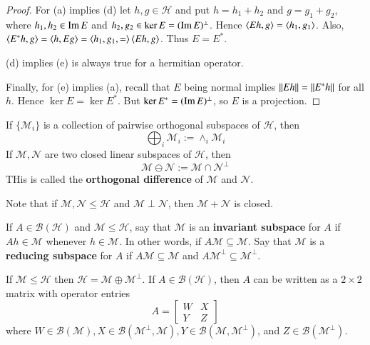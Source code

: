 \begin{proof}
    For (a) implies (d) let $h,g \in \mathscr{H}$ and put $h = h_1+h_2$ and $g = g_1+g_2$, where $h_1,h_2 \in \operatorname{Im} E$ and $h_2,g_2 \in \ker E = (\operatorname{Im} E)^{\perp}$. Hence $\left\langle Eh, g\right\rangle = \left\langle h_1, g_1\right\rangle$. Also, $\left\langle E^*h, g\right\rangle = \left\langle h, Eg\right\rangle = \left\langle h_1,g_1, =\right\rangle \left\langle Eh, g\right\rangle$. Thus $E = E^*$.

    (d) implies (e) is always true for a hermitian operator.

    Finally, for (e) implies (a), recall that $E$ being normal implies $\left|\left| Eh\right|\right| = \left|\left| E^*h\right|\right|$ for all $h$. Hence $\ker E = \ker E^*$. But $\ker E^* = (\operatorname{Im} E)^{\perp}$, so $E$ is a projection.
\end{proof}

\begin{defn}
    If $\{\mathscr{M}_i\}$ is a collection of pairwise orthogonal subspaces of $\mathscr{H}$, then $$\bigoplus_i\mathscr{M}_i := \land_i\mathscr{M}_i$$
    If $\mathscr{M},\mathscr{N}$ are two closed linear subspaces of $\mathscr{H}$, then $$\mathscr{M}\ominus\mathscr{N} := \mathscr{M}\cap \mathscr{N}^{\perp}$$
    THis is called the \textbf{orthogonal difference} of $\mathscr{M}$ and $\mathscr{N}$.
\end{defn}

Note that if $\mathscr{M},\mathscr{N}\leq \mathscr{H}$ and $\mathscr{M}\perp\mathscr{N}$, then $\mathscr{M}+\mathscr{N}$ is closed.

\begin{defn}
    If $A \in \mathscr{B}(\mathscr{H})$ and $\mathscr{M} \leq \mathscr{H}$, say that $\mathscr{M}$ is an \textbf{invariant subspace} for $A$ if $Ah \in \mathscr{M}$ whenever $h \in \mathscr{M}$. In other words, if $A\mathscr{M} \subseteq \mathscr{M}$. Say that $\mathscr{M}$ is a \textbf{reducing subspace} for $A$ if $A\mathscr{M}\subseteq \mathscr{M}$ and $A\mathscr{M}^{\perp} \subseteq \mathscr{M}^{\perp}$.
\end{defn}

If $\mathscr{M} \leq \mathscr{H}$ then $\mathscr{H} = \mathscr{M} \oplus \mathscr{M}^{\perp}$. If $A \in \mathscr{B}(\mathscr{H})$, then $A$ can be written as a $2\times 2$ matrix with operator entries $$A = \begin{bmatrix} W & X \\ Y & Z \end{bmatrix}$$
where $W \in \mathscr{B}(\mathscr{M}), X\in \mathscr{B}(\mathscr{M}^{\perp},\mathscr{M}),Y\in\mathscr{B}(\mathscr{M},\mathscr{M}^{\perp})$, and $Z \in \mathscr{B}(\mathscr{M}^{\perp})$.

